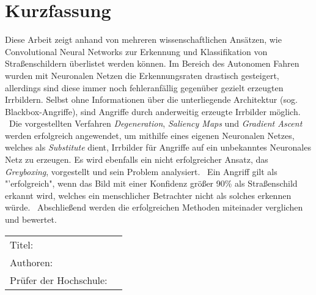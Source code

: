\chapter*{Kurzfassung} 
Diese Arbeit zeigt anhand von mehreren wissenschaftlichen Ansätzen, wie Convolutional Neural Networks zur Erkennung und Klassifikation von Straßenschildern überlistet werden können.
Im Bereich des Autonomen Fahren wurden mit Neuronalen Netzen die Erkennungsraten drastisch gesteigert, allerdings sind diese immer noch fehleranfällig gegenüber gezielt erzeugten Irrbildern. Selbst ohne Informationen über die unterliegende Architektur (sog. Blackbox-Angriffe), sind Angriffe durch anderweitig erzeugte Irrbilder möglich.
~\newline Die vorgestellten Verfahren \textit{Degeneration}, \textit{Saliency Maps} und \textit{Gradient Ascent} werden erfolgreich angewendet, um mithilfe eines eigenen Neuronalen Netzes, welches als \textit{Substitute} dient, Irrbilder für Angriffe auf ein unbekanntes Neuronales Netz zu erzeugen. Es wird ebenfalls ein nicht erfolgreicher Ansatz, das \textit{Greyboxing}, vorgestellt und sein Problem analysiert.
~\newline Ein Angriff gilt als "'erfolgreich", wenn das Bild mit einer Konfidenz größer 90\% als Straßenschild erkannt wird, welches ein menschlicher Betrachter nicht als solches erkennen würde.
~\newline Abschließend werden die erfolgreichen Methoden miteinader verglichen und bewertet. 
~\newline 
~\newline
\begin{flushleft}
	\begin{tabular}{lp{11cm}}
		Titel:&  \titel \\ 
		Authoren:&  \autor \\
		Prüfer der Hochschule: &  \betreuerth \\ 
		[6ex]%
	\end{tabular} 
\end{flushleft}
